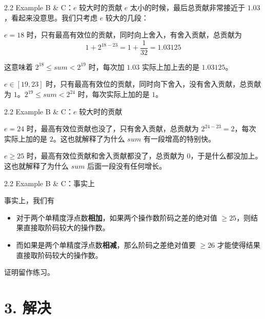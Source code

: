 \documentclass{beamer}
\begin{document}
\begin{frame}{2.2 Example B \& C：$e$ 较大时的贡献}
$e$ 太小的时候，最后总贡献非常接近于 $1.03$，看起来没意思。我们只考虑 $e$ 较大的几段：
\pause

\vspace{0.5em}

$e=18$ 时，只有最高有效位的贡献，同时向上舍入，有舍入贡献，总贡献为
\[
1+2^{18-23} = 1+\frac{1}{32} = 1.03125
\]

\pause

这意味着 $2^{18} \le sum < 2^{19}$ 时，每次加 $1.03$ 实际上加上去的是 $1.03125$。
\pause

\vspace{0.5em}

$e\in [19,23]$ 时，只有最高有效位的贡献，同时向下舍入，没有舍入贡献，总贡献为 $1$。$2^{19} \le sum < 2^{24}$ 时，每次实际上加的是 $1$。
\end{frame}

\begin{frame}{2.2 Example B \& C：$e$ 较大时的贡献}

$e=24$ 时，最高有效位贡献也没了，只有舍入贡献，总贡献为 $2^{24-23}=2$，每次实际上加的是 $2$。这也就解释了为什么 $sum$ 有一段增高的特别快。

\pause

\vspace{0.5em}

$e\ge 25$ 时，最高有效位贡献和舍入贡献都没了，总贡献为 $0$，于是什么都没加上。这也就解释了为什么 $sum$ 后面一段没有任何增长。

\end{frame}

\begin{frame}{2.2 Example B \& C：事实上}
\begin{block}{事实上，我们有}
\begin{itemize}
  \item 对于两个单精度浮点数\textbf{相加}，如果两个操作数阶码之差的绝对值 $\ge 25$，则结果直接取阶码较大的操作数。
  \item 而如果是两个单精度浮点数\textbf{相减}，那么阶码之差绝对值要 $\ge 26$ 才能使得结果直接取阶码较大的操作数。
\end{itemize}
\end{block}
\pause
证明留作练习。
\end{frame}

\section{3. 解决}
\end{document}
